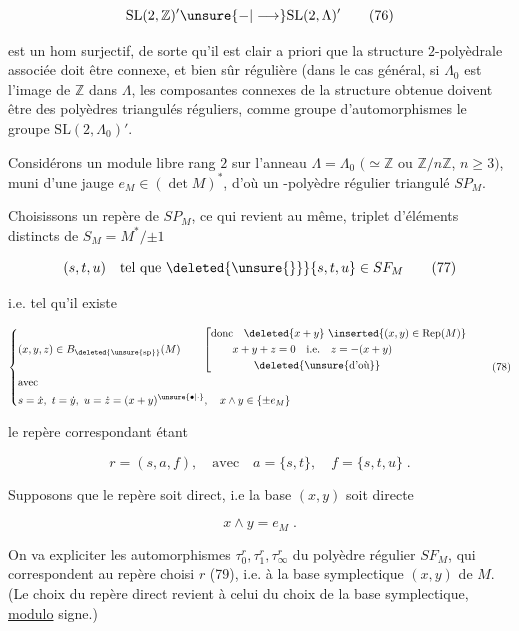 \[
\mathrm{SL}(2,\mathbb{Z})'\unsure{\mathbin{-}|\longrightarrow}\mathrm{SL}(2,\Lambda)'\tag*{(76)}
\]


est un hom surjectif, de sorte qu'il est clair a priori que la structure $2$-polyèdrale associée doit être connexe, et bien sûr régulière (dans le cas général, si $\Lambda_0$ est l'image de $\mathbb{Z}$ dans $\Lambda$, les composantes connexes de la structure obtenue doivent être des polyèdres triangulés réguliers,     comme groupe d'automorphismes  le groupe $\mathrm{SL}(2,\Lambda_0)'$.



Considérons un module libre    rang $2$ sur l'anneau $\Lambda=\Lambda_0$ $(\simeq\mathbb{Z}$ ou $\mathbb{Z}/n\mathbb{Z}$, $n\geq3)$,  muni d'une jauge $e_M\in(\det M)^*$, d'où un -polyèdre régulier triangulé $SP_M$.

Choisissons un repère  de $SP_M$,    ce qui revient au même,  triplet d'éléments distincts de $S_M=M^*/{\pm1}$

\[
(s,t,u)\quad\text{tel que }\deleted{\unsure{\}}}\{s,t,u\}\in SF_M\tag*{(77)}
\]

i.e. tel qu'il existe

\[
\left\{\begin{aligned}
&(x,y,z)\in B_{\deleted{\unsure{\mathrm{sp}}}}(M)\qquad
\left[\begin{aligned}
&\text{donc}\quad\deleted{x+y}\ \inserted{(x,y)\in\operatorname{Rep}(M)}\\
&\qquad x+y+z=0\quad\text{i.e.}\quad z=-(x+y)\\
&\qquad\qquad\deleted{\text{\unsure{d'où}}}
\end{aligned}\right.\\
&\text{avec}\\
&s=\dot{x},\ t=\dot{y},\ u=\dot{z}=(x+y)^{\unsure{\bullet|\cdot}},\quad x\wedge y\in\{\pm e_M\}
\end{aligned}\right.\tag*{(78)}
\]

le repère correspondant étant

\[
r=(s,a,f),\quad\text{avec}\quad a=\{s,t\},\quad f=\{s,t,u\}\;.\tag*{(79)}
\]

 Supposons que le repère soit direct, i.e la base $(x,y)$ soit directe

\[
x\wedge y=e_M\;.\tag*{(80)}
\]

On va expliciter les automorphismes $\tau_0^r,\tau_1^r,\tau_\infty^r$ du polyèdre régulier $SF_M$, qui correspondent au repère  choisi $r$ (79), i.e. à la base symplectique $(x,y)$ de $M$. (Le choix  du repère direct revient à celui du choix de la base symplectique, \uline{modulo} signe.)

